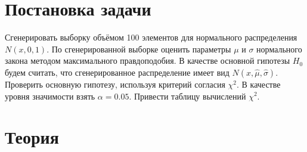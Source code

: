 
\usepackage{amsmath}




\renewcommand\contentsname{\centerline{Содержание}}
\tableofcontents
\newpage

\listoftables
\newpage

\section{Постановка задачи}
Сгенерировать выборку объёмом 100 элементов для нормального распределения $N(x, 0, 1)$. По сгенерированной выборке оценить параметры $\mu$ и $\sigma$ нормального закона методом максимального правдоподобия. В качестве основной гипотезы $H_0$ будем считать, что сгенерированное распределение имеет вид $N(x, \widehat{\mu}, \widehat{\sigma})$. Проверить основную гипотезу, используя критерий согласия $\chi^2$. В качестве уровня значимости взять $\alpha=0.05$. Привести таблицу вычислений $\chi^2$.

\section{Теория}
